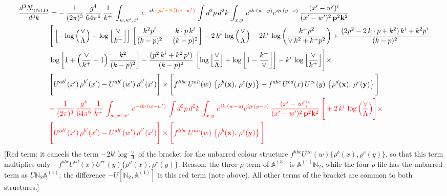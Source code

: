 \documentclass[9pt]{article}
\def\mf#1{\mathbb{#1}}
\numberwithin{equation}{section}
\begin{document}
\begin{align}
   \frac{d^{3}N_{2\,\rm NLO}^{\rm}}{d^{3}k} &  = -\,\frac{1}{(2\pi)^{3}}\,\frac{g^{4}}{64\pi^{6}}\, \frac{1}{k^{+}}\,\int_{w,w',x'}\, e^{-ik\cdot {\color{orange}\cancel{(w'-w)}}{\color{red}(w-w')}}\,\int d^{2}p\,d^{2}k\,\int_{x,y}\, e^{ik\cdot (w-y)} e^{ip\cdot (y-x)}\, \frac{(x'-w')^{i}}{(x'-w')^{2}\,\mathbf{p}^{2}\mathbf{k}^{2} }\notag \\ & \Bigg[\left[-\log{\left(\frac{\vee}{\Lambda}\right)}+\log{\left[\frac{\vee}{k^{+}}\right]}\right]\,\left[\frac{k^{2}p^{i}}{(k-p)^{2}}-\frac{k\cdot p\,k^{i}}{(k-p)^{2}}\right]-2\,k^{i}\,\log{\left(\frac{\vee}{\Lambda}\right)} -2k^{i}\,\log{\left(\frac{k^{+}p^{2}}{\vee\, k^{2}+k^{+}p^{2}}\right)}+\frac{(2p^{2}-2\,k\cdot p + k^{2})\,k^{i} + k^{2}p^{i}}{(k-p)^{2}}\notag \\ &  \log{\left[1+\left(\frac{\vee}{k^{+}}-1\right)\frac{k^{2}}{(k-p)^{2}}\right]} - \frac{(p^{2}\,k^{i}+k^{2}\,p^{i})}{(k-p)^{2}}\,\left[\log{\left[\frac{\vee}{\Lambda}\right]}+\log{\left[1-\frac{k^{+}}{\vee}\right]}\right]-k^{i}\,\log{\left[\frac{\vee}{k^{+}}\right]}\Bigg]\times\,\notag \\ &  \Bigg[U^{ab'}(x')\,\rho^{b'}(x') - U^{ab'}(w')\,\rho^{b'}(x')\Bigg]\times\Bigg[f^{hbc}\,U^{ah}(w)\,\left\{ \rho^{b}(\mathbf{x}),\,\rho^{c}(\mathbf{y})\right\}-f^{abc}\,U^{bd}(x)\, U^{ce}(y)\, \left\{\rho^{d}(\mathbf{x}),\,\rho^{e}(\mathbf{y})\right\}\Bigg] \notag \\ & {\color{red}-\,\frac{1}{(2\pi)^{3}}\,\frac{g^{4}}{64\pi^{6}}\, \frac{1}{k^{+}}\,\int_{w,w^{\prime},x^{\prime}}\, e^{-ik\cdot (w-w^{\prime})}\,\int d^{2}p\,d^{2}k\,\int_{x,y}\, e^{ik\cdot (w-y)} e^{ip\cdot (y-x)}\, \frac{(x^{\prime}-w^{\prime})^{i}}{(x^{\prime}-w^{\prime})^{2}\,\mathbf{p}^{2}\mathbf{k}^{2} }\,\Bigg[+2\,k^{i}\,\log{\left(\frac{\vee}{\Lambda}\right)}\Bigg]\times} \notag \\ & {\color{red}\Bigg[U^{ab^{\prime}}(x^{\prime})\,\rho^{b^{\prime}}(x^{\prime}) - U^{ab^{\prime}}(w^{\prime})\,\rho^{b^{\prime}}(x^{\prime})\Bigg]\times\Bigg[f^{hbc}\,U^{ah}(w)\,\left\{ \rho^{b}(\mathbf{x}),\,\rho^{c}(\mathbf{y})\right\}\Bigg]}
\end{align} {\color{red}[Red term: it cancels the term $-2k^{i}\log\frac{\vee}{\Lambda}$ of the bracket for the unbarred colour structure $f^{hbc}U^{ah}(w)\{\rho^{b}(x),\rho^{c}(y)\}$, so that this term multiplies only $-f^{abc}U^{bd}(x)U^{ce}(y)\{\rho^{d}(x),\rho^{e}(y)\}$. Reason: the three-$\rho$ term of $\mf{A}^{(3)}$ is $\mf{A}^{(1)}\mf{N}_{2}$, while the four-$\rho$ file has the unbarred term as $U\mf{N}_{2}\mf{A}^{(1)}$; the difference $-U[\mf{N}_{2},\mf{A}^{(1)}]$ is this red term (note above). All other terms of the bracket are common to both structures.]}\par\noindent
\end{document}
